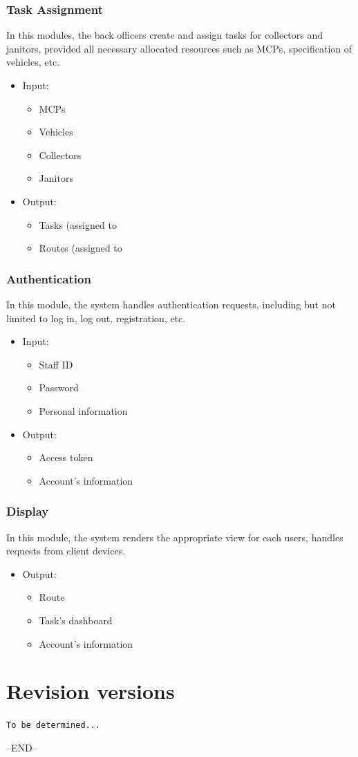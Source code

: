\documentclass[a4paper, 13pt]{article}
\begin{document}
\subsubsection*{Task Assignment}
In this modules, the back officers create and assign tasks for collectors and janitors, provided all necessary allocated resources such as MCPs, specification of vehicles, etc. 
\begin{itemize}
    \item Input:
    \begin{itemize}
        \item MCPs
        \item Vehicles
        \item Collectors
        \item Janitors
    \end{itemize}
    \item Output:
    \begin{itemize}
        \item Tasks (assigned to 
        \item Routes (assigned to 
    \end{itemize}
\end{itemize}
\subsubsection*{Authentication}
In this module, the system handles authentication requests, including but not limited to log in, log out, registration, etc.
\begin{itemize}
    \item Input:
    \begin{itemize}
        \item Staff ID
        \item Password
        \item Personal information
    \end{itemize}
    \item Output:
    \begin{itemize}
        \item Access token
        \item Account's information
    \end{itemize}
\end{itemize}
\subsubsection*{Display}
In this module, the system renders the appropriate view for each users, handles requests from client devices.
\begin{itemize}
    \item Output:
    \begin{itemize}
        \item Route
        \item Task's dashboard
        \item Account's information
    \end{itemize}
\end{itemize}

\section{Revision versions}
\texttt{To be determined...}
    
\centering --END--
\end{document}
